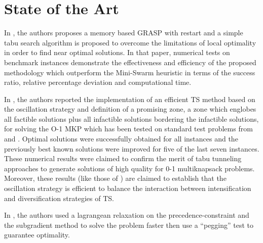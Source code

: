 \section{State of the Art}

In \cite{bib:grasp-and-tabu}, the authors proposes a memory based GRASP with restart and a simple tabu search algorithm is proposed to overcome the limitations of local optimality in order to find near optimal solutions. In that paper, numerical tests on benchmark instances demonstrate the effectiveness and efficiency of the proposed methodology which outperform the Mini-Swarm heuristic in terms of the success ratio, relative percentage deviation and computational time.

In \cite{bib:tabu-knapsack}, the authors reported the implementation of an efficient TS method based on the oscillation strategy and definition of a promising zone, a zone which englobes all factible solutions plus all infactible solutions bordering the infactible solutions, for solving the O-1 MKP which has been tested on standard test problems from \cite{bib:freville,bib:preprocessing-knapsack-1994} and \cite{bib:tabu-multidimensional-knapsack}. Optimal solutions were successfully obtained for all instances and the previously best known solutions were improved for five of the last seven instances. These numerical results were claimed to confirm the merit of tabu tunneling approaches to generate solutions of high quality for 0-1 multiknapsack problems. Moreover, these results (like those of \cite{bib:tabu-multidimensional-knapsack}) are claimed to establish that the oscillation strategy is efficient to balance the interaction between intensification and diversification strategies of TS.

In \cite{bib:constrained-knapsack}, the authors used a lagrangean relaxation on the precedence-constraint and the subgradient method to solve the problem faster then use a ``pegging'' test to guarantee optimality.
